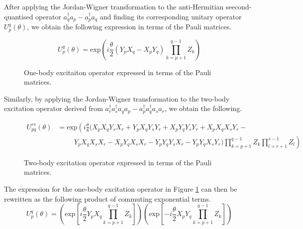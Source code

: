 After applying the Jordan-Wigner transformation to the anti-Hermitian seecond-quantised operator $a_q^\dagger a_p - a_p^\dagger a_q$ and finding its corresponding unitary operator $U^q_p(\theta)$, we obtain the following expression in terms of the Pauli matrices.

\begin{figure}[H]
    \centering
    \begin{equation*}
        U^q_p (\theta) =
        \text{exp} \left( i
        \frac{\theta}{2} (Y_p X_q - X_p Y_q) \prod_{k=p+1}^{q-1} Z_k \right)
    \end{equation*}
    \caption{One-body excitaiton operator expressed in terms of the Pauli matrices.}
    \label{one-body-excitation-operator}
\end{figure}

Similarly, by applying the Jordan-Wigner transformation to the two-body excitation operator derived from $a_r^\dagger a_s^\dagger a_q a_p - a_p^\dagger a_q^\dagger a_s a_r$, we obtain the following.

\begin{figure}[H]
    \centering
    \begin{align*}
        U^{rs}_{pq} (\theta) &= \text{exp} \left( i \frac{\theta}{8} (
        X_p X_q Y_s X_r +
        Y_p X_q Y_s Y_r +
        X_p Y_q Y_s Y_r +
        X_p X_q X_s Y_r - \right. \\
        &\left. \hspace{1cm} 
        Y_p X_q X_s X_r -
        X_p Y_q X_s X_r -
        Y_p Y_q Y_s X_r -
        Y_p Y_q X_s Y_r )
        \prod_{k=p+1}^{q-1} Z_k
        \prod_{l=r+1}^{s-1} Z_l
        \right)
    \end{align*}
    \caption{Two-body excitation operator expressed in terms of the Pauli matrices.}
\end{figure}

The expression for the one-body excitation operator in Figure \ref{one-body-excitation-operator} can then be rewritten as the following product of commuting exponential terms.
\vspace{10pt}
\begin{equation*}
    U^q_p (\theta) =
    \left( \text{exp} \left[
    i \frac{\theta}{2} Y_p X_q \prod_{k=p+1}^{q-1} Z_k \right] \right)
    \left( \text{exp} \left[ -
    i \frac{\theta}{2} X_p Y_q \prod_{k=p+1}^{q-1} Z_k \right] \right)
\end{equation*}
\vspace{-16pt}

